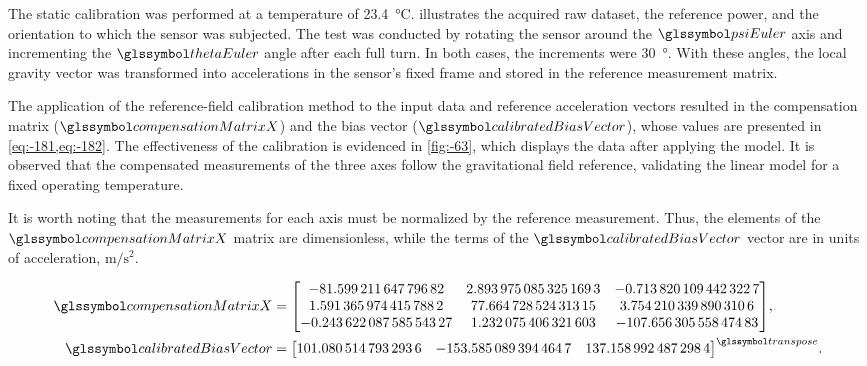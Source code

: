 \documentclass[sensors,article,accept,pdftex,moreauthors]{Definitions/mdpi}
\begin{document}
The static calibration was performed at a temperature of \SI{23.4}{\celsius}.  illustrates the acquired raw dataset, the reference power, and the orientation to which the sensor was subjected. The test was conducted by rotating the sensor around the $\psiEuler$ axis and incrementing the $\thetaEuler$ angle after each full turn. In both cases, the increments were \SI{30}{\degree}. With these angles, the local gravity vector was transformed into accelerations in the sensor's fixed frame and stored in the reference measurement matrix.

The application of the reference-field calibration method to the input data and reference acceleration vectors resulted in the compensation matrix ($\compensationMatrixX$) and the bias vector ($\calibratedBiasVector$), whose values are presented in \cref{eq:-181,eq:-182}. The effectiveness of the calibration is evidenced in \cref{fig:-63}, which displays the data after applying the model. It is observed that the compensated measurements of the three axes follow the gravitational field reference, validating the linear model for a fixed operating temperature.

It is worth noting that the measurements for each axis must be normalized by the reference measurement. Thus, the elements of the $\compensationMatrixX$ matrix are dimensionless, while the terms of the $\calibratedBiasVector$ vector are in units of acceleration, $\si{\meter\per\second\squared}$.

\vspace{-6pt}
\begin{subequations}
	\label{eq:-38-1}
	\begin{align}
		\compensationMatrixX  & =\left[\begin{matrix}\num{-81.59921164779682}   & \num{2.8939750853251693} & \num{-0.7138201094423227} \\
              \num{1.5913659744157882}   & \num{77.66472852431315}  & \num{3.7542103398903106}  \\
              \num{-0.24362208758554327} & \num{1.232075406321603}  & \num{-107.65630555847483}
			                               \end{matrix}\right],\label{eq:-181}                                            \\
		\calibratedBiasVector & =\left[\begin{matrix}\num{101.0805147932936} & \num{-153.5850893944647} & \num{137.1589924872984}\end{matrix}\right]^{\transpose}.\label{eq:-182}
	\end{align}
\end{subequations}
\end{document}
